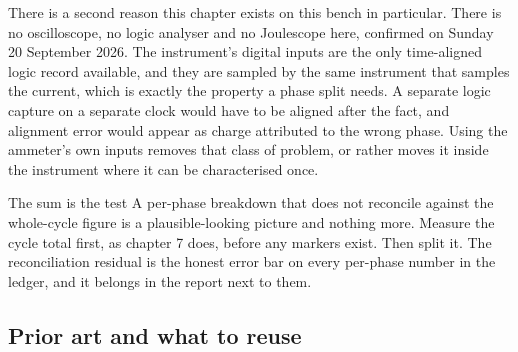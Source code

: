 There is a second reason this chapter exists on this bench in particular. There
is no oscilloscope, no logic analyser and no Joulescope here, confirmed on
Sunday 20 September 2026. The instrument's digital inputs are the only
time-aligned logic record available, and they are sampled by the same instrument
that samples the current, which is exactly the property a phase split needs. A
separate logic capture on a separate clock would have to be aligned after the
fact, and alignment error would appear as charge attributed to the wrong phase.
Using the ammeter's own inputs removes that class of problem, or rather moves it
inside the instrument where it can be characterised once.

\begin{note}{The sum is the test}
A per-phase breakdown that does not reconcile against the whole-cycle figure is
a plausible-looking picture and nothing more. Measure the cycle total first, as
chapter 7 does, before any markers exist. Then split it. The reconciliation
residual is the honest error bar on every per-phase number in the ledger, and it
belongs in the report next to them.
\end{note}

\subsection*{Prior art and what to reuse}

